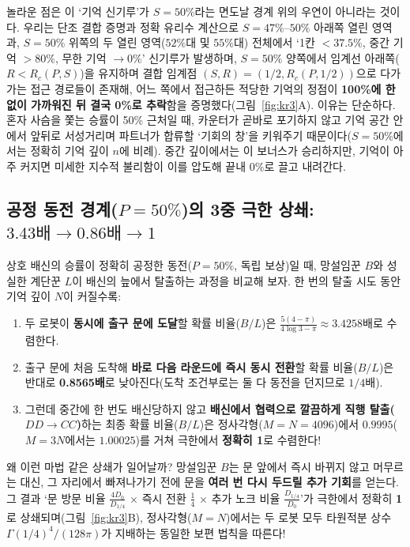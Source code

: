 \documentclass[11pt,a4paper]{article}
\begin{document}
놀라운 점은 이 `기억 신기루'가 $S=50\%$라는 면도날 경계 위의 우연이 아니라는 것이다. 우리는 단조 결합 증명과 정확 유리수 계산으로 $S=47\%\text{--}50\%$ 아래쪽 열린 영역과, $S=50\%$ 위쪽의 두 열린 영역($52\%$대 및 $55\%$대) 전체에서 `1칸 $< 37.5\%$, 중간 기억 $> 80\%$, 무한 기억 $\to 0\%$' 신기루가 발생하며, $S=50\%$ 양쪽에서 임계선 아래쪽($R < R_c(P, S)$)을 유지하며 결합 임계점 $(S, R) = (1/2, R_c(P, 1/2))$으로 다가가는 접근 경로들이 존재해, 어느 쪽에서 접근하든 적당한 기억의 정점이 \textbf{100\%에 한없이 가까워진 뒤 결국 0\%로 추락}함을 증명했다(그림~\ref{fig:kr3}A). 이유는 단순하다. 혼자 사슴을 쫓는 승률이 50\% 근처일 때, 카운터가 곧바로 포기하지 않고 기억 공간 안에서 앞뒤로 서성거리며 파트너가 합류할 `기회의 창'을 키워주기 때문이다($S=50\%$에서는 정확히 기억 깊이 $n$에 비례). 중간 깊이에서는 이 보너스가 승리하지만, 기억이 아주 커지면 미세한 지수적 불리함이 이를 압도해 끝내 0\%로 끌고 내려간다.

\subsection{공정 동전 경계(\texorpdfstring{$P=50\%$}{P=50\%})의 3중 극한 상쇄: \texorpdfstring{$3.43\text{배} \to 0.86\text{배} \to 1$}{3.43x -> 0.86x -> 1}}
상호 배신의 승률이 정확히 공정한 동전($P=50\%$, 독립 보상)일 때, 망설임꾼 $B$와 성실한 계단꾼 $L$이 배신의 늪에서 탈출하는 과정을 비교해 보자. 한 번의 탈출 시도 동안 기억 깊이 $N$이 커질수록:
\begin{enumerate}
  \item 두 로봇이 \textbf{동시에 출구 문에 도달}할 확률 비율($B/L$)은 $\frac{5(4-\pi)}{4\log 3 - \pi} \approx \mathbf{3.4258\text{배}}$로 수렴한다.
  \item 출구 문에 처음 도착해 \textbf{바로 다음 라운드에 즉시 동시 전환}할 확률 비율($B/L$)은 반대로 \textbf{0.8565배}로 낮아진다(도착 조건부로는 둘 다 동전을 던지므로 $1/4$배).
  \item 그런데 중간에 한 번도 배신당하지 않고 \textbf{배신에서 협력으로 깔끔하게 직행 탈출($DD \to CC$)}하는 최종 확률 비율($B/L$)은 정사각형($M=N=4096$)에서 $0.9995$($M=3N$에서는 $1.00025$)를 거쳐 극한에서 \textbf{정확히 1}로 수렴한다!
\end{enumerate}
왜 이런 마법 같은 상쇄가 일어날까? 망설임꾼 $B$는 문 앞에서 즉시 바뀌지 않고 머무르는 대신, 그 자리에서 빠져나가기 전에 문을 \textbf{여러 번 다시 두드릴 추가 기회}를 얻는다. 그 결과 `문 방문 비율 $\frac{4D_0}{D_{1/4}}$ $\times$ 즉시 전환 $\frac{1}{4}$ $\times$ 추가 노크 비율 $\frac{D_{1/4}}{D_0}$'가 극한에서 정확히 \textbf{1}로 상쇄되며(그림~\ref{fig:kr3}B), 정사각형($M=N$)에서는 두 로봇 모두 타원적분 상수 $\Gamma(1/4)^4/(128\pi)$가 지배하는 동일한 보편 법칙을 따른다!
\end{document}
